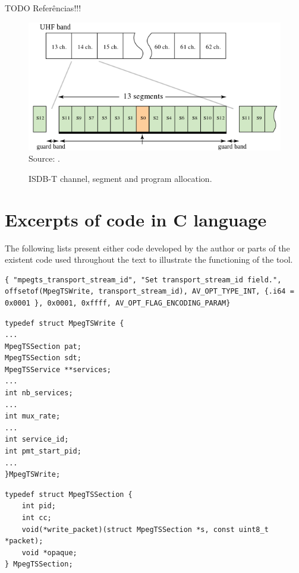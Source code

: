 \documentclass[
	12pt,				%
	openright,			%
	twoside,			%
	a4paper,			%
	brazil,
	french,				%
	english
	]{abntex2}
\begin{document}
\begin{apendicesenv}
TODO Referências!!!

\begin{figure}
\centering
\caption{ISDB-T channel, segment and program allocation.}
\includegraphics[width=0.8\linewidth]{figuras/ISDB-T_CH_Seg_Prog_allocation.png}
\\Source: .
\label{fig:ISDB-T_CH_Seg_Prog_allocation}
\end{figure}

\chapter{Excerpts of code in C language}

The following lists present either code developed by the author or parts of the existent code used throughout the text to illustrate the functioning of the tool.

\begin{lstlisting}[caption={Example of input option}, label=lst_input_option]
{ "mpegts_transport_stream_id", "Set transport_stream_id field.", offsetof(MpegTSWrite, transport_stream_id), AV_OPT_TYPE_INT, {.i64 = 0x0001 }, 0x0001, 0xffff, AV_OPT_FLAG_ENCODING_PARAM}
\end{lstlisting}

\begin{lstlisting}[caption={Excerpt of MpegTSWrite structure}, label=lst_MpegTSWrite]
typedef struct MpegTSWrite {
...
MpegTSSection pat;
MpegTSSection sdt;
MpegTSService **services;
...
int nb_services;
...
int mux_rate;
...
int service_id;
int pmt_start_pid;
...
}MpegTSWrite;
\end{lstlisting}

\begin{lstlisting}[caption={Excerpt of MpegTSSection structure}, label=lst_MpegTSSection]
typedef struct MpegTSSection {
	int pid;
	int cc;
	void(*write_packet)(struct MpegTSSection *s, const uint8_t *packet);
	void *opaque;
} MpegTSSection;
\end{lstlisting}


\end{apendicesenv}
\end{document}
